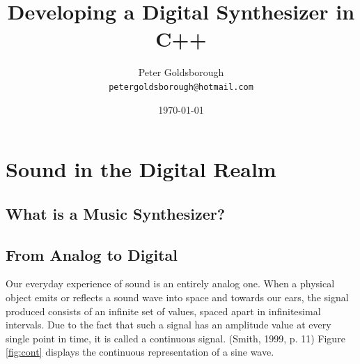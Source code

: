 \documentclass[12pt]{report}
\begin{document}
\everymath{\displaystyle}

\pagestyle{fancy}
\fancyhf{}
\lhead{\leftmark}
\rhead{\rightmark}
\cfoot{\thepage}



\newcommand{\code}[1]{}

\newcommand{\citebs}[1]{(Mitchell, 2008, p. #1)}

\newcommand{\citedsp}[1]{(Smith, 1999, p. #1)}

\title{Developing a Digital Synthesizer in C++}

\author{
Peter Goldsborough\\
\texttt{petergoldsborough@hotmail.com}
}

\date{\today}

\maketitle

\tableofcontents

\chapter{Sound in the Digital Realm}

\section{What is a Music Synthesizer?}



\section{From Analog to Digital}

Our everyday experience of sound is an entirely analog one. When a physical     object emits or reflects a sound wave into space and towards our ears, the signal produced consists of an infinite set of values, spaced apart in infinitesimal intervals. Due to the fact that such a signal has an amplitude value at every single point in time, it is called a continuous signal. \citedsp{11} Figure \ref{fig:cont} displays the continuous representation of a sine wave.
\end{document}
